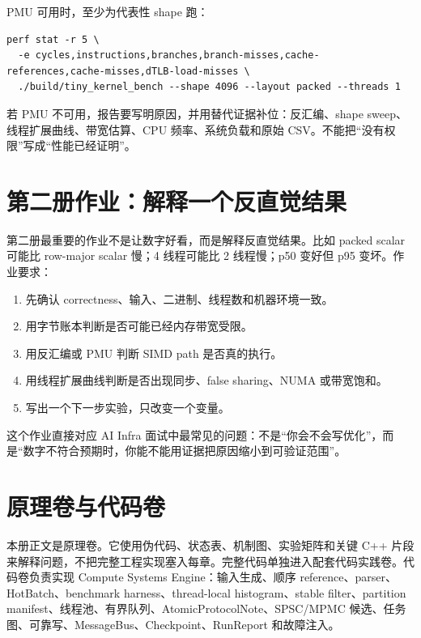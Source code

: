 PMU 可用时，至少为代表性 shape 跑：

\begin{lstlisting}[numbers=none,caption={第二册 perf stat 模板}]
perf stat -r 5 \
  -e cycles,instructions,branches,branch-misses,cache-references,cache-misses,dTLB-load-misses \
  ./build/tiny_kernel_bench --shape 4096 --layout packed --threads 1
\end{lstlisting}

若 PMU 不可用，报告要写明原因，并用替代证据补位：反汇编、shape sweep、线程扩展曲线、带宽估算、CPU 频率、系统负载和原始 CSV。不能把“没有权限”写成“性能已经证明”。

\section*{第二册作业：解释一个反直觉结果}

第二册最重要的作业不是让数字好看，而是解释反直觉结果。比如 packed scalar 可能比 row-major scalar 慢；4 线程可能比 2 线程慢；p50 变好但 p95 变坏。作业要求：

\begin{enumerate}
  \item 先确认 correctness、输入、二进制、线程数和机器环境一致。
  \item 用字节账本判断是否可能已经内存带宽受限。
  \item 用反汇编或 PMU 判断 SIMD path 是否真的执行。
  \item 用线程扩展曲线判断是否出现同步、false sharing、NUMA 或带宽饱和。
  \item 写出一个下一步实验，只改变一个变量。
\end{enumerate}

这个作业直接对应 AI Infra 面试中最常见的问题：不是“你会不会写优化”，而是“数字不符合预期时，你能不能用证据把原因缩小到可验证范围”。

\section*{原理卷与代码卷}

本册正文是原理卷。它使用伪代码、状态表、机制图、实验矩阵和关键 C++ 片段来解释问题，不把完整工程实现塞入每章。完整代码单独进入配套代码实践卷。代码卷负责实现 Compute Systems Engine：输入生成、顺序 reference、parser、HotBatch、benchmark harness、thread-local histogram、stable filter、partition manifest、线程池、有界队列、AtomicProtocolNote、SPSC/MPMC 候选、任务图、可靠写、MessageBus、Checkpoint、RunReport 和故障注入。

